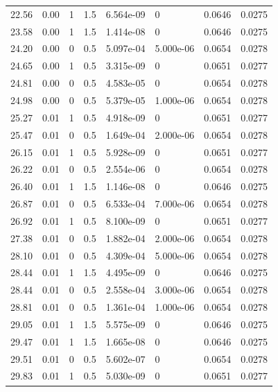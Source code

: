 \documentclass[preview]{standalone}
\begin{document}
{{{\begin{tabular}{L{1.2cm}C{1.2cm} C{0.3cm}C{0.5cm} C{1.4cm}C{1.4cm} C{1.4cm}C{1.4cm}}
  22.56  &  0.00  & 1     & 1.5 &  6.564e-09  & 0  & 0.0646 &  0.0275   \\ 
  23.58  &  0.00  & 1     & 1.5 &  1.414e-08  & 0  & 0.0646 &  0.0275   \\ 
  24.20  &  0.00  & 0     & 0.5 &  5.097e-04  & 5.000e-06  & 0.0654 &  0.0278   \\ 
  24.65  &  0.00  & 1     & 0.5 &  3.315e-09  & 0  & 0.0651 &  0.0277   \\ 
  24.81  &  0.00  & 0     & 0.5 &  4.583e-05  & 0  & 0.0654 &  0.0278   \\ 
  24.98  &  0.00  & 0     & 0.5 &  5.379e-05  & 1.000e-06  & 0.0654 &  0.0278   \\ 
  25.27  &  0.01  & 1     & 0.5 &  4.918e-09  & 0  & 0.0651 &  0.0277   \\ 
  25.47  &  0.01  & 0     & 0.5 &  1.649e-04  & 2.000e-06  & 0.0654 &  0.0278   \\ 
  26.15  &  0.01  & 1     & 0.5 &  5.928e-09  & 0  & 0.0651 &  0.0277   \\ 
  26.22  &  0.01  & 0     & 0.5 &  2.554e-06  & 0  & 0.0654 &  0.0278   \\ 
  26.40  &  0.01  & 1     & 1.5 &  1.146e-08  & 0  & 0.0646 &  0.0275   \\ 
  26.87  &  0.01  & 0     & 0.5 &  6.533e-04  & 7.000e-06  & 0.0654 &  0.0278   \\ 
  26.92  &  0.01  & 1     & 0.5 &  8.100e-09  & 0  & 0.0651 &  0.0277   \\ 
  27.38  &  0.01  & 0     & 0.5 &  1.882e-04  & 2.000e-06  & 0.0654 &  0.0278   \\ 
  28.10  &  0.01  & 0     & 0.5 &  4.309e-04  & 5.000e-06  & 0.0654 &  0.0278   \\ 
  28.44  &  0.01  & 1     & 1.5 &  4.495e-09  & 0  & 0.0646 &  0.0275   \\ 
  28.44  &  0.01  & 0     & 0.5 &  2.558e-04  & 3.000e-06  & 0.0654 &  0.0278   \\ 
  28.81  &  0.01  & 0     & 0.5 &  1.361e-04  & 1.000e-06  & 0.0654 &  0.0278   \\ 
  29.05  &  0.01  & 1     & 1.5 &  5.575e-09  & 0  & 0.0646 &  0.0275   \\ 
  29.47  &  0.01  & 1     & 1.5 &  1.665e-08  & 0  & 0.0646 &  0.0275   \\ 
  29.51  &  0.01  & 0     & 0.5 &  5.602e-07  & 0  & 0.0654 &  0.0278   \\ 
  29.83  &  0.01  & 1     & 0.5 &  5.030e-09  & 0  & 0.0651 &  0.0277   \\ 

\end{tabular}}}}
\end{document}
